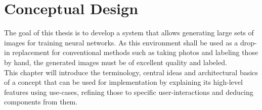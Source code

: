 
\chapter{Conceptual Design}
\label{chap:conceptual-design}
The goal of this thesis is to develop a system that allows generating large sets of images for training neural networks. As this environment shall be used as a drop-in replacement for conventional methods such as taking photos and labeling those by hand, the generated images must be of excellent quality and labeled.\\
This chapter will introduce the terminology, central ideas and architectural basics of a concept that can be used for implementation by explaining its high-level features using use-cases, refining those to specific user-interactions and deducing components from them.

